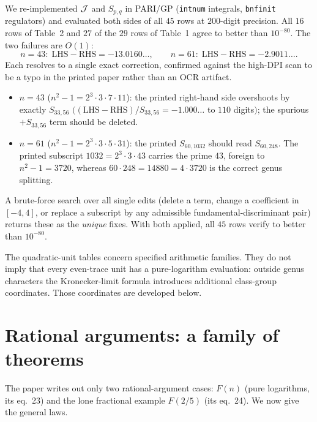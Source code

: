 We re-implemented $\mathcal{J}$ and $S_{p,q}$ in PARI/GP (\texttt{intnum} integrals, \texttt{bnfinit} regulators)
and evaluated both sides of all $45$ rows at $200$-digit precision. All $16$ rows of Table~2 and $27$ of the
$29$ rows of Table~1 agree to better than $10^{-80}$. The two failures are $O(1)$:
\[
  \text{$n=43$:}\ \ \text{LHS}-\text{RHS}=-13.0160\ldots,\qquad
  \text{$n=61$:}\ \ \text{LHS}-\text{RHS}=-2.9011\ldots .
\]
Each resolves to a single exact correction, confirmed against the high-DPI scan to be a typo in the printed
paper rather than an OCR artifact.

\begin{proposition}
\leavevmode
\begin{itemize}[topsep=2pt,itemsep=1pt]
\item $n=43$ ($n^2-1=2^3\cdot3\cdot7\cdot11$): the printed right-hand side overshoots by exactly $S_{33,56}$
$\bigl((\text{LHS}-\text{RHS})/S_{33,56}=-1.000\ldots$ to $110$ digits$\bigr)$; the spurious $+S_{33,56}$
term should be deleted.
\item $n=61$ ($n^2-1=2^3\cdot3\cdot5\cdot31$): the printed $S_{60,1032}$ should read $S_{60,248}$. The
printed subscript $1032=2^3\cdot3\cdot43$ carries the prime $43$, foreign to $n^2-1=3720$, whereas
$60\cdot248=14880=4\cdot3720$ is the correct genus splitting.
\end{itemize}
A brute-force search over all single edits (delete a term, change a coefficient in $[-4,4]$, or replace a
subscript by any admissible fundamental-discriminant pair) returns these as the \emph{unique} fixes. With
both applied, all $45$ rows verify to better than $10^{-80}$.
\end{proposition}

The quadratic-unit tables concern specified arithmetic families. They do
not imply that every even-trace unit has a pure-logarithm evaluation:
outside genus characters the Kronecker-limit formula introduces additional
class-group coordinates. Those coordinates are developed below.

\section{Rational arguments: a family of theorems}\label{herg:sec:rational}
The paper writes out only two rational-argument cases: $F(n)$ (pure logarithms, its eq.~23) and the lone
fractional example $F(2/5)$ (its eq.~24). We now give the general laws.

